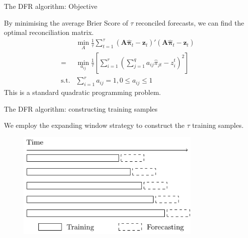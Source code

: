 \documentclass[12pt]{beamer}
\begin{document}
\begin{frame}{The DFR algorithm: Objective}
    \begin{outline}
        \0 By minimising the average Brier Score of $\tau$ reconciled forecasts, we can find the optimal reconciliation matrix.
        \[
            \begin{aligned}
          &\min_{A}\frac{1}{\tau}\sum_{t=1}^{\tau}(\mathbf{A}\hat{\boldsymbol{\pi}}_t - \mathbf{z}_t)'(\mathbf{A}\hat{\boldsymbol{\pi}}_t - \mathbf{z}_t) \\
          =&\min_{a_{ij}}\frac{1}{\tau}\left[\sum_{i=1}^r\left(\sum_{j=1}^q a_{ij}\hat\pi_{jt} - z_i^t\right)^2\right] \\
          \text{s.t.} & \sum_{i=1}^r a_{ij} = 1, 0\leq a_{ij} \leq 1
            \end{aligned}
        \]
        \0 This is a standard quadratic programming problem.
    \end{outline}
\end{frame}


\begin{frame}{The DFR algorithm: constructing training samples}

We employ the expanding window strategy to construct the $\tau$ training samples.

\begin{figure}
\includegraphics[width=0.8\textwidth]{../manuscript/figures/rolling_window.pdf}
\end{figure}
\end{frame}
\end{document}
